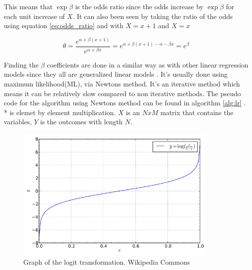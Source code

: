 \documentclass[10pt,a4paper]{report}
\begin{document}
This means that $\exp{\beta}$ is the odds ratio since the odds increase by $\exp{\beta}$ for each unit increase of $X$\cite{agresti_categorical}. It can also been seen by taking the ratio of the odds using equation \ref{eq:odds_ratio} and  with $X=x+1$ and $X=x$

\begin{equation}
\theta=\frac{e^{\alpha+\beta (x+1)}}{e^{\alpha+\beta x}}=e^{\alpha+\beta (x+1)-\alpha-\beta x}=e^{\beta}
\end{equation}

Finding the $\beta$ coefficients are done in a similar way as with other linear regression models since they all are generalized linear models \cite{agresti_categorical}. It's usually done using  maximum likelihood(ML), via Newtons method\cite{agresti_categorical, uvehag_master_thesis}. It's an iterative method which means it can be relatively slow compared to non iterative methods. The pseudo code for the algorithm using Newtons method can be found in algorithm \ref{alg:lr} \cite{uvehag_master_thesis}. * is elemet by element multiplication. $X$ is an $NxM$ matrix that contains the variables, $Y$ is the outcomes with length $N$.

\begin{figure}[h]
    \centering
    \includegraphics[width=10cm]{logit.png}
    \caption{Graph of the logit transformation. Wikipedia Commons}
    \label{fig:logit}
\end{figure}
\end{document}
